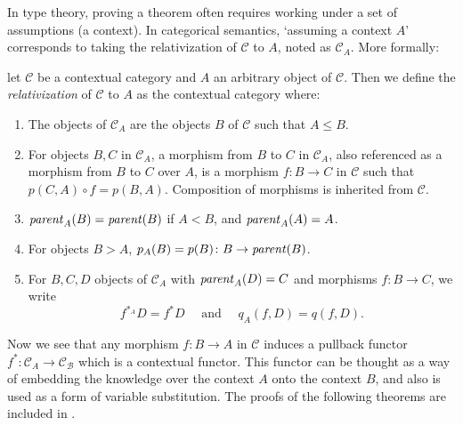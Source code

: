 In type theory, proving a theorem often requires working under a set of assumptions (a context).
In categorical semantics, `assuming a context $A$' corresponds to taking the relativization of $\mathcal{C}$
to $A$, noted as $\mathcal{C}_A$.
More formally:
\begin{definition}
    let $\mathcal{C}$ be a contextual category and $A$ an arbitrary object of $\mathcal{C}$. Then we define 
    the \textit{relativization} of $\mathcal{C}$ to $A$ as the contextual category
    where:
    \begin{enumerate}
        \item The objects of $\mathcal{C}_A$ are the objects $B$ of $\mathcal{C}$ such that $A \leq B$.
        \item For objects $B, C$ in $\mathcal{C}_A$, a morphism from $B$ to $C$ in $\mathcal{C}_A$, also referenced as a morphism from $B$ to $C$ over $A$,
                is a morphism $f \colon B \to C$ in $\mathcal{C}$ such that $p(C, A) \circ f = p(B, A)$. Composition of morphisms is inherited from $\mathcal{C}$.
        \item $\operatorname{\mathit{parent}}_A(B) = \operatorname{\mathit{parent}}(B)$ if $A < B$, and $\operatorname{\mathit{parent}}_A(A) = A$.
        \item For objects $B > A$, $p_A(B) = p(B) \colon B \to \operatorname{\mathit{parent}}(B)$.
        \item For $B, C, D$ objects of $\mathcal{C}_A$ with $\operatorname{\mathit{parent}}_A(D) = C$ and morphisms $f \colon B \to C$, we write
                \[
                    f^{*_A}D = f^*D \quad \text{ and } \quad q_A(f, D) = q(f, D).
                \]
    \end{enumerate}
\end{definition}

Now we see that any morphism $f \colon B \to A$ in $\mathcal{C}$ induces a pullback functor 
$f^* \colon \mathcal{C}_A \to \mathcal{C_B}$ which is a contextual functor. 
This functor can be thought as a way of embedding the knowledge over the context $A$ onto the context $B$,
and also is used as a form of variable substitution.
The proofs of the following theorems are included in \cite{streicher}.

